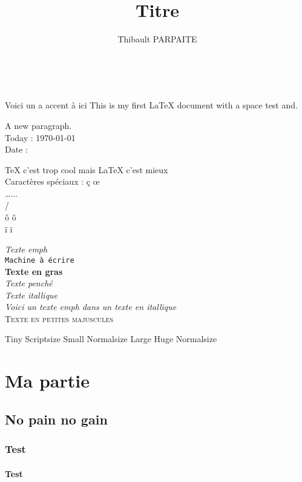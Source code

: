 \documentclass[12pt]{report}
\title{Titre}
\author{Thibault PARPAITE}
\begin{document}
\maketitle
\tableofcontents

\newpage

Voici un a accent à ici
This is my first \LaTeX{} document with a space \hspace{6pt} test and.

\vspace{50pt}

A new paragraph. \\
Today : \today \\
Date : \date \\
\TeX\- c'est trop cool mais \LaTeX\- c'est mieux \\
Caractères spéciaux : \c{c} \oe \\
\dots ... \\
\slash \\
\^o ô \\
\"i ï 

\bigbreak

\noindent\emph{Texte emph} \\
\texttt{Machine à écrire} \\
\textbf{Texte en gras} \\
\textsl{Texte penché} \\
\textit{Texte itallique} \\
\textit{Voici un \emph{texte emph} dans un texte en itallique} \\
\textsc{Texte en petites majuscules}

\bigbreak

\tiny Tiny
\scriptsize Scriptsize
\small Small
\normalsize Normalsize
\large Large
\huge Huge
\normalsize Normalsize

\bigbreak

\part{Ma partie}
\chapter{No pain no gain}
\section{Test}
\subsection{Test}
\end{document}
